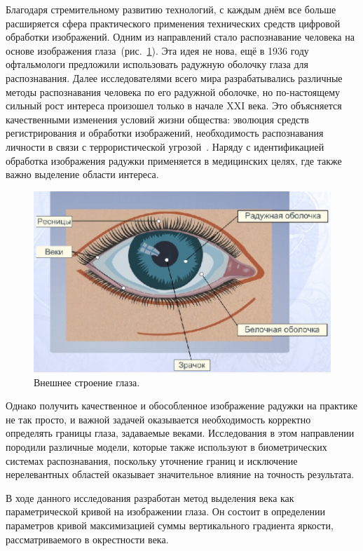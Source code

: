 \documentclass[12pt,a4paper]{article} %
\begin{document}
Благодаря стремительному развитию технологий, с каждым днём все больше расширяется сфера практического применения технических средств цифровой обработки изображений. Одним из направлений стало распознавание человека на основе изображения глаза~(рис.~\ref{fig:glaz}). Эта идея не нова, ещё в 1936 году офтальмологи \cite{Medic} предложили использовать радужную оболочку глаза для распознавания. Далее исследователями всего мира разрабатывались различные методы распознавания человека по его радужной оболочке, но по-настоящему сильный рост интереса произошел только в начале XXI века. Это объясняется качественными изменения условий жизни общества: эволюция средств регистрирования и обработки изображений, необходимость распознавания личности в связи с террористической угрозой~\cite{Conf3, Terr, Tech}. Наряду с идентификацией обработка изображения радужки применяется в медицинских целях, где также важно выделение области интереса. 

\begin{figure}[h]
	
	\centering
	
	\includegraphics[width=0.6\linewidth]{glaz.jpg}
	
	\caption{Внешнее строение глаза.}
	
	\label{fig:glaz}
	
\end{figure}

Однако получить качественное и обособленное изображение радужки на практике не так просто, и важной задачей оказывается необходимость корректно определять границы глаза, задаваемые веками. Исследования в этом направлении породили различные модели, которые также используют в биометрических системах распознавания, поскольку уточнение границ и исключение нерелевантных областей оказывает значительное влияние на точность результата.

В ходе данного исследования разработан метод выделения века как параметрической кривой на изображении глаза. Он состоит в определении параметров кривой максимизацией суммы вертикального градиента яркости, рассматриваемого в окрестности века.
 
\end{document}
